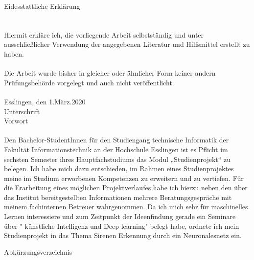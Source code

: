 \documentclass[a4paper,11pt]{article}
\theoremstyle{mytheor}
\begin{document}
\vspace*{150px}
\noindent\huge{Eidesstattliche Erklärung}\\\\
\large{\\
Hiermit erkläre ich, die vorliegende Arbeit selbstständig und unter ausschließlicher Verwendung der angegebenen Literatur und Hilfsmittel erstellt zu haben.\\\\
Die Arbeit wurde bisher in gleicher oder ähnlicher Form keiner andern Prüfungsbehörde vorgelegt und auch nicht veröffentlicht.\\
\\Esslingen, den 1.März.2020 \hspace{2.5cm}{\_\_\_\_\_\_\_\_\_\_\_\_\_\_\_\_\_}
\\\hspace*{9.3cm}Unterschrift\\}
\vspace*{250px}
\newpage
\vspace*{150px}
\noindent\huge{Vorwort}\\\\
\large{Den Bachelor-StudentInnen für den Studiengang technische Informatik der Fakultät Informationstechnik an der Hochschule Esslingen ist es Pflicht im sechsten Semester ihres Hauptfachstudiums das Modul „Studienprojekt“ zu belegen. Ich habe mich dazu entschieden, im Rahmen eines Studienprojektes meine im Studium erworbenen Kompetenzen zu erweitern und zu vertiefen. Für die Erarbeitung eines möglichen Projektverlaufes habe ich hierzu neben den über das Institut bereitgestellten Informationen mehrere Beratungsgespräche mit meinem fachinternen Betreuer wahrgenommen. Da ich mich sehr für maschinelles Lernen interessiere und zum Zeitpunkt der Ideenfindung gerade ein Seminare über " künstliche Intelligenz und Deep learning" \space belegt habe, ordnete ich mein Studienprojekt in das Thema Sirenen Erkennung durch ein Neuronalesnetz ein.}
\newpage
\tableofcontents
\newpage
{}

\listoffigures
\newpage
{}
\noindent\huge{Abkürzungsverzeichnis}
\\ \large
\begin{acronym}[Bash]
\end{acronym}
\newpage
\end{document}
